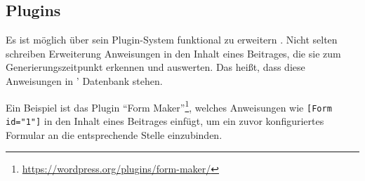     \subsection{Plugins}
        \label{section:wordpressPlugins}
        Es ist möglich {\wordpress} über sein Plugin-System funktional
        zu erweitern \cite{wordpress:Plugins}.
        Nicht selten schreiben Erweiterung Anweisungen in den Inhalt
        eines Beitrages, die sie zum Generierungszeitpunkt erkennen und auswerten.
        Das heißt, dass diese Anweisungen in {\wordpress'} Datenbank stehen.

        Ein Beispiel ist das Plugin
        "`Form Maker"'\footnote{\url{https://wordpress.org/plugins/form-maker/}},
        welches Anweisungen wie \texttt{[Form id="1"]} in den Inhalt eines Beitrages
        einfügt, um ein zuvor konfiguriertes Formular an die entsprechende Stelle einzubinden.
